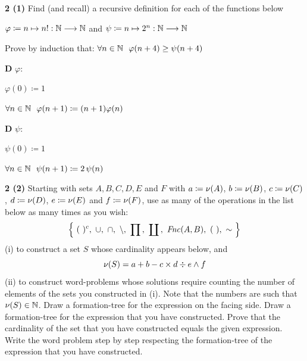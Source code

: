 \documentclass[11pt]{article}
\begin{document}


\noindent\textbf{2 (1)} \quad Find (and recall) a recursive definition for each of the functions below

\begin{center}
$\varphi \coloneqq n \mapsto n! : \mathbb{N} \longrightarrow \mathbb{N}$ \quad and \quad
$\psi \coloneqq n \mapsto 2^n : \mathbb{N} \longrightarrow \mathbb{N}$
\end{center}

\noindent Prove by induction that: $\forall n \in \mathbb{N} \ \ \varphi(n+4) \geq \psi(n+4)$

\vspace{10pt}
\textbf{D} \quad $\varphi$:

\bclabel
\hspace{1em}$\varphi(0)\coloneqq1$

\rcslabel
\hspace{1em}$\forall n\in\N\ \ \varphi(n+1)\coloneqq(n+1)\varphi(n)$

\textbf{D} \quad $\psi$:

\bclabel
\hspace{1em}$\psi(0)\coloneqq1$

\rcslabel
\hspace{1em}$\forall n\in\N\ \ \psi(n+1)\coloneqq2\,\psi(n)$

\newpage

\newpage
{}
\noindent\textbf{2 (2)} \quad Starting with sets $A,B,C,D,E$ and $F$ with $a\coloneqq\nu(A)$, $b\coloneqq\nu(B)$, $c\coloneqq\nu(C)$, $d\coloneqq\nu(D)$, $e\coloneqq\nu(E)$ and $f\coloneqq\nu(F)$, use as many of the operations in the list below as many times as you wish:
$$\left\{\ (\ )^c,\ \cup,\ \cap,\ \backslash,\ \prod{},\ \coprod{},\ \Fnc{A}{B},\ (\ ),\ \sim\ \right\}$$
(i) to construct a set $S$ whose cardinality appears below, and
$$\nu(S) = a+b-c\times d \div e \wedge f$$
(ii) to construct word-problems whose solutions require counting the number of elements of the sets you constructed in (i). Note that the numbers are such that $\nu(S)\in\mathbb{N}$. Draw a formation-tree for the expression on the facing side. Draw a formation-tree for the expression that you have constructed. Prove that the cardinality of the set that you have constructed equals the given expression. Write the word problem step by step respecting the formation-tree of the expression that you have constructed.
\end{document}
